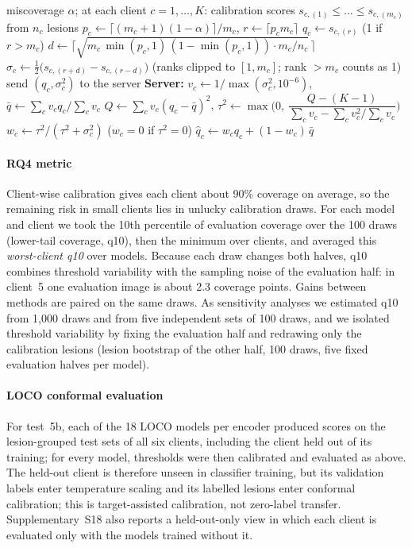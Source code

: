 \documentclass[VANCOUVER,Times1COL]{WileyNJDv5}
\begin{document}
\begin{algorithm}[!t]
\caption{EB-ShrinkFCP: per-client conformal thresholds with empirical-Bayes shrinkage.}
\label{alg:eb}
\begin{algorithmic}[1]
\Require miscoverage $\alpha$; at each client $c=1,\dots,K$: calibration scores $s_{c,(1)}\le\dots\le s_{c,(m_c)}$ from $n_c$ lesions
  \State $p_c \gets \lceil (m_c+1)(1-\alpha)\rceil/m_c$, \quad $r \gets \lceil p_c m_c\rceil$
  \State $q_c \gets s_{c,(r)}$ \quad (1 if $r>m_c$)
  \State $d \gets \big\lceil \sqrt{m_c\,\min(p_c,1)\,(1-\min(p_c,1))\cdot m_c/n_c}\,\big\rceil$
  \State $\sigma_c \gets \tfrac12\big(s_{c,(r+d)}-s_{c,(r-d)}\big)$ \quad (ranks clipped to $[1,m_c]$; rank $>m_c$ counts as 1)
  \State send $(q_c,\sigma_c^2)$ to the server
\EndFor
\State \textbf{Server:} $v_c \gets 1/\max(\sigma_c^2,10^{-6})$, \quad $\bar q \gets \sum_c v_c q_c / \sum_c v_c$
\State $Q \gets \sum_c v_c (q_c-\bar q)^2$, \quad $\tau^2 \gets \max\!\Big(0,\ \dfrac{Q-(K-1)}{\sum_c v_c-\sum_c v_c^2/\sum_c v_c}\Big)$
  \State $w_c \gets \tau^2/(\tau^2+\sigma_c^2)$ \quad ($w_c=0$ if $\tau^2=0$)
  \State $\hat q_c \gets w_c q_c + (1-w_c)\,\bar q$ 
\EndFor
\end{algorithmic}
\end{algorithm}

\paragraph{RQ4 metric} Client-wise calibration gives each client about 90\% coverage on average, so the
remaining risk in small clients lies in unlucky calibration draws. For each model and client we took the
10th percentile of evaluation coverage over the 100 draws (lower-tail coverage, q10), then the minimum over
clients, and averaged this \emph{worst-client q10} over models. Because each draw changes both halves,
q10 combines threshold variability with the sampling noise of the evaluation half: in client~5 one
evaluation image is about 2.3 coverage points. Gains between methods are paired on the same draws. As
sensitivity analyses we estimated q10 from 1,000 draws and from five independent sets of 100 draws, and we
isolated threshold variability by fixing the evaluation half and redrawing only the calibration lesions
(lesion bootstrap of the other half, 100 draws, five fixed evaluation halves per model).

\paragraph{LOCO conformal evaluation} For test~5b, each of the 18 LOCO models per encoder produced scores on
the lesion-grouped test sets of all six clients, including the client held out of its training; for every
model, thresholds were then calibrated and evaluated as above. The held-out client is therefore unseen in
classifier training, but its validation labels enter temperature scaling and its labelled lesions enter conformal calibration; this is target-assisted calibration, not zero-label transfer. Supplementary~S18 also reports a held-out-only view in which each client is evaluated only with the models trained without it.
\end{document}
